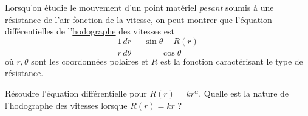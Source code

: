 

\begin{exercice}\label{exo_II-1-08}

Lorsqu'on étudie le mouvement d'un point matériel \emph{pesant} soumis à une résistance de l'air fonction de la vitesse, on peut montrer que l'équation différentielles de l'\href{http://fr.wikipedia.org/wiki/Hodographe}{hodographe} des vitesses est 
\begin{equation}
	\frac{1}{ r }\frac{ dr }{ d\theta }=\frac{ \sin\theta+R(r) }{ \cos\theta }
\end{equation}
où $r,\theta$ sont les coordonnées polaires et $R$ est la fonction caractérisant le type de résistance.

Résoudre l'équation différentielle pour $R(r)=kr^{\alpha}$. Quelle est la nature de l'hodographe des vitesses lorsque $R(r)=kr$ ?

\end{exercice}
